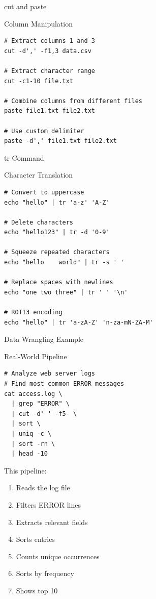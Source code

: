 \documentclass[presentation,aspectratio=1610]{beamer}
\begin{document}
\begin{frame}[label={sec:org324f184},fragile]{cut and paste}
 \begin{block}{Column Manipulation}
\begin{verbatim}
# Extract columns 1 and 3
cut -d',' -f1,3 data.csv

# Extract character range
cut -c1-10 file.txt

# Combine columns from different files
paste file1.txt file2.txt

# Use custom delimiter
paste -d',' file1.txt file2.txt
\end{verbatim}
\end{block}
\end{frame}
\begin{frame}[label={sec:org972d52f},fragile]{tr Command}
 \begin{block}{Character Translation}
\begin{verbatim}
# Convert to uppercase
echo "hello" | tr 'a-z' 'A-Z'

# Delete characters
echo "hello123" | tr -d '0-9'

# Squeeze repeated characters
echo "hello    world" | tr -s ' '

# Replace spaces with newlines
echo "one two three" | tr ' ' '\n'

# ROT13 encoding
echo "hello" | tr 'a-zA-Z' 'n-za-mN-ZA-M'
\end{verbatim}
\end{block}
\end{frame}
\begin{frame}[label={sec:org942f2b0},fragile]{Data Wrangling Example}
 \begin{block}{Real-World Pipeline}
\begin{verbatim}
# Analyze web server logs
# Find most common ERROR messages
cat access.log \
  | grep "ERROR" \
  | cut -d' ' -f5- \
  | sort \
  | uniq -c \
  | sort -rn \
  | head -10
\end{verbatim}

This pipeline:
\begin{enumerate}
\item Reads the log file
\item Filters ERROR lines
\item Extracts relevant fields
\item Sorts entries
\item Counts unique occurrences
\item Sorts by frequency
\item Shows top 10
\end{enumerate}
\end{block}
\end{frame}
\end{document}
